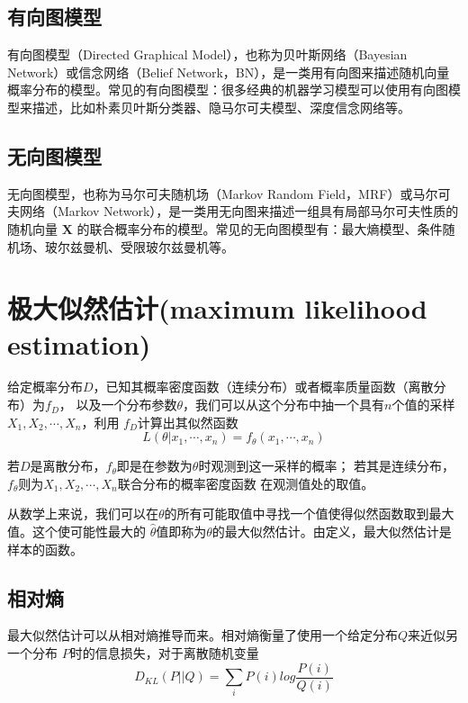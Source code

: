 \subsection*{有向图模型}

有向图模型（Directed Graphical Model），也称为贝叶斯网络（Bayesian Network）或信念网络（Belief Network，BN），是一类用有向图来描述随机向量概率分布的模型。常见的有向图模型：很多经典的机器学习模型可以使用有向图模型来描述，比如朴素贝叶斯分类器、隐马尔可夫模型、深度信念网络等。

\subsection*{无向图模型}

无向图模型，也称为马尔可夫随机场（Markov Random Field，MRF）或马尔可夫网络（Markov Network），是一类用无向图来描述一组具有局部马尔可夫性质的随机向量 $\mathbf{X}$
 的联合概率分布的模型。常见的无向图模型有：最大熵模型、条件随机场、玻尔兹曼机、受限玻尔兹曼机等。

\section{极大似然估计(maximum likelihood estimation)}

给定概率分布$D$，已知其概率密度函数（连续分布）或者概率质量函数（离散分布）为$f_D$，
以及一个分布参数$\theta$，我们可以从这个分布中抽一个具有$n$个值的采样$X_1,X_2,\cdots,X_n$，利用
$f_D$计算出其似然函数
\begin{equation}
    L(\theta|x_1,\cdots,x_n)=f_\theta(x_1,\cdots,x_n)
\end{equation}

若$D$是离散分布，$f_\theta$即是在参数为$\theta$时观测到这一采样的概率；
若其是连续分布，$f_\theta$则为$X_1,X_2,\cdots,X_n$联合分布的概率密度函数
在观测值处的取值。

从数学上来说，我们可以在$\displaystyle \theta$的所有可能取值中寻找一个值使得似然函数取到最大值。这个使可能性最大的
$\displaystyle {\widehat {\theta }}$值即称为$\displaystyle \theta$的最大似然估计。由定义，最大似然估计是样本的函数。

\subsection*{相对熵}

最大似然估计可以从相对熵推导而来。相对熵衡量了使用一个给定分布$Q$来近似另一个分布
$P$时的信息损失，对于离散随机变量
\begin{equation}
    D_{KL}(P||Q)=\sum_{i}P(i)log\frac{P(i)}{Q(i)}
\end{equation}

